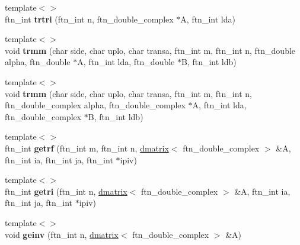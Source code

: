 \begin{DoxyCompactItemize}
\item 
\hypertarget{classsddk_1_1linalg_3_01_c_p_u_01_4_ac4b4ba2ef448ddbd5d6c8ac064291a87}{}{\footnotesize template$<$$>$ }\\ftn\+\_\+int {\bfseries trtri} (ftn\+\_\+int n, ftn\+\_\+double\+\_\+complex $\ast$A, ftn\+\_\+int lda)\label{classsddk_1_1linalg_3_01_c_p_u_01_4_ac4b4ba2ef448ddbd5d6c8ac064291a87}

\item 
\hypertarget{classsddk_1_1linalg_3_01_c_p_u_01_4_a84055181a77b37082bde96a1be6205f2}{}{\footnotesize template$<$$>$ }\\void {\bfseries trmm} (char side, char uplo, char transa, ftn\+\_\+int m, ftn\+\_\+int n, ftn\+\_\+double alpha, ftn\+\_\+double $\ast$A, ftn\+\_\+int lda, ftn\+\_\+double $\ast$B, ftn\+\_\+int ldb)\label{classsddk_1_1linalg_3_01_c_p_u_01_4_a84055181a77b37082bde96a1be6205f2}

\item 
\hypertarget{classsddk_1_1linalg_3_01_c_p_u_01_4_ad3878086b73f170d1f3d495d0899b74a}{}{\footnotesize template$<$$>$ }\\void {\bfseries trmm} (char side, char uplo, char transa, ftn\+\_\+int m, ftn\+\_\+int n, ftn\+\_\+double\+\_\+complex alpha, ftn\+\_\+double\+\_\+complex $\ast$A, ftn\+\_\+int lda, ftn\+\_\+double\+\_\+complex $\ast$B, ftn\+\_\+int ldb)\label{classsddk_1_1linalg_3_01_c_p_u_01_4_ad3878086b73f170d1f3d495d0899b74a}

\item 
\hypertarget{classsddk_1_1linalg_3_01_c_p_u_01_4_a3b8d0f09ee8e6c208b4cd950196aa81d}{}{\footnotesize template$<$$>$ }\\ftn\+\_\+int {\bfseries getrf} (ftn\+\_\+int m, ftn\+\_\+int n, \hyperlink{classsddk_1_1dmatrix}{dmatrix}$<$ ftn\+\_\+double\+\_\+complex $>$ \&A, ftn\+\_\+int ia, ftn\+\_\+int ja, ftn\+\_\+int $\ast$ipiv)\label{classsddk_1_1linalg_3_01_c_p_u_01_4_a3b8d0f09ee8e6c208b4cd950196aa81d}

\item 
\hypertarget{classsddk_1_1linalg_3_01_c_p_u_01_4_ad0cb7066b121cd52ea2c2798e0b38083}{}{\footnotesize template$<$$>$ }\\ftn\+\_\+int {\bfseries getri} (ftn\+\_\+int n, \hyperlink{classsddk_1_1dmatrix}{dmatrix}$<$ ftn\+\_\+double\+\_\+complex $>$ \&A, ftn\+\_\+int ia, ftn\+\_\+int ja, ftn\+\_\+int $\ast$ipiv)\label{classsddk_1_1linalg_3_01_c_p_u_01_4_ad0cb7066b121cd52ea2c2798e0b38083}

\item 
\hypertarget{classsddk_1_1linalg_3_01_c_p_u_01_4_a4621d4574b6c3cfbd2785d0650549176}{}{\footnotesize template$<$$>$ }\\void {\bfseries geinv} (ftn\+\_\+int n, \hyperlink{classsddk_1_1dmatrix}{dmatrix}$<$ ftn\+\_\+double\+\_\+complex $>$ \&A)\label{classsddk_1_1linalg_3_01_c_p_u_01_4_a4621d4574b6c3cfbd2785d0650549176}


\end{DoxyCompactItemize}
